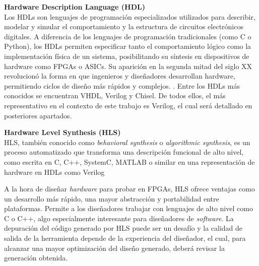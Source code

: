 \vspace{0.4em} %

\begin{adjustwidth}{1.5cm}{}
\textbf{Hardware Description Language (HDL)} \vspace{0.25cm} \\
Los \ac{HDL}s son lenguajes de programación especializados utilizados para describir, modelar y simular el comportamiento y la estructura de circuitos electrónicos digitales. A diferencia de los lenguajes de programación tradicionales (como C o Python), los HDLs permiten especificar tanto el comportamiento lógico como la implementación física de un sistema, posibilitando su síntesis en dispositivos de hardware como FPGAs o ASICs. Su aparición en la segunda mitad del siglo XX revolucionó la forma en que ingenieros y diseñadores desarrollan hardware, permitiendo ciclos de diseño más rápidos y complejos. \cite{infoHDL}. Entre los HDLs más conocidos se encuentran VHDL, Verilog y Chisel. De todos ellos, el más representativo en el contexto de este trabajo es Verilog, el cual será detallado en posteriores apartados.
\end{adjustwidth}


\vspace{0.4em} %

\begin{adjustwidth}{1.5cm}{}
\textbf{Hardware Level Synthesis (HLS)} \vspace{0.25cm} \\
\ac{HLS}, también conocido como \emph{behavioral synthesis} o \textit{algorithmic synthesis}, es un proceso automatizado que transforma una descripción funcional de alto nivel, como escrita en C, C++, SystemC, MATLAB o similar en una representación de hardware en HDLs como Verilog \cite{infoHLS}

A la hora de diseñar \textit{hardware} para probar en FPGAs, HLS ofrece ventajas como un desarrollo más rápido, una mayor abstracción y portabilidad entre plataformas. Permite a los diseñadores trabajar con lenguajes de alto nivel como C o C++, algo especialmente interesante para diseñadores de \textit{software}. La depuración del código generado por HLS puede ser un desafío y la calidad de salida de la herramienta depende de la experiencia del diseñador, el cual, para alcanzar una mayor optimización del diseño generado, deberá revisar la generación obtenida. \cite{ventajasHLS}
\end{adjustwidth}

